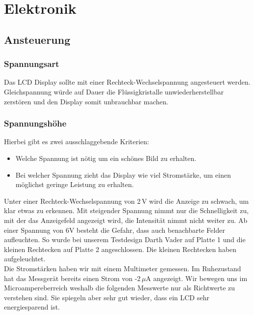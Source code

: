 \section{Elektronik}\label{sec:elektronik}
\subsection{Ansteuerung}
\subsubsection{Spannungsart}
Das LCD Display sollte mit einer Rechteck-Wechselspannung angesteuert werden. Gleichspannung würde auf Dauer die Flüssigkristalle unwiederherstellbar zerstören und den Display somit unbrauchbar machen.
\subsubsection{Spannungshöhe}\label{subsec:spannung}
Hierbei gibt es zwei ausschlaggebende Kriterien:
\begin{itemize}
\item Welche Spannung ist nötig um ein schönes Bild zu erhalten.
\item Bei welcher Spannung zieht das Display wie viel Stromstärke, um einen möglichst geringe Leistung zu erhalten.
\end{itemize}

Unter einer Rechteck-Wechselspannung von 2\,V wird die Anzeige zu schwach, um klar etwas zu erkennen. Mit steigender Spannung nimmt nur die Schnelligkeit zu, mit der das Anzeigefeld angezeigt wird, die Intensität nimmt nicht weiter zu. Ab einer Spannung von 6V besteht die Gefahr, dass auch benachbarte Felder aufleuchten. So wurde bei unserem Testdesign {\quote Darth Vader} auf Platte 1 und die {\quote kleinen Rechtecken} auf Platte 2 angeschlossen. Die kleinen Rechtecken haben aufgeleuchtet.\\
Die Stromstärken haben wir mit einem Multimeter gemessen. Im Ruhezustand hat das Messgerät bereits einen Strom von -2\,$\mu$A 
 angezeigt. Wir bewegen uns im Microampereberreich weshalb die folgenden Messwerte nur als Richtwerte zu verstehen sind. Sie spiegeln aber sehr gut wieder, dass ein LCD sehr energiesparend ist.

